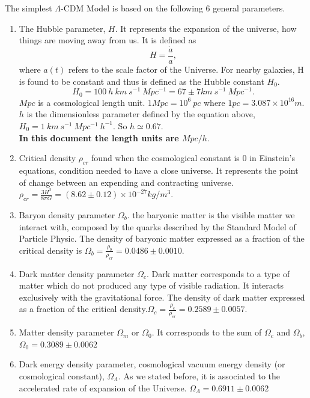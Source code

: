 \documentclass[12pt]{article}
\begin{document}
\begin{par}
The simplest $\Lambda$-CDM Model is based on the following 6 general parameters.\\
\begin{enumerate}
\item The Hubble parameter, $H$. It represents the expansion of the universe, how things are moving away from us. It is defined as
\[
H = \frac{\dot{a}}{a},
\]
where $a(t)$ refers to the scale factor of the Universe. For
 nearby galaxies, H is found to be constant and thus is
  defined as the Hubble constant $H_0$. 
\[
H_0 = 100 \ h \ km \ s^{-1} \ Mpc^{-1} = 67 \pm 7 km \  s^{-1} \ Mpc^{-1} .
\]
$Mpc$ is a cosmological length unit. $1 Mpc = 10^6 \ pc$ where $1 pc = 3.087 \times
  10^{16} m$. \\
  $h$ is the dimensionless parameter defined
   by the equation above, $H_0 = 1 \ km \ s^{-1} \ Mpc^{-1} \ h^{-1}$. So $h \simeq 0.67$.\\
   \textbf{In this document the length units are $Mpc/h$}.

\item Critical density $\rho_{cr}$ found when the cosmological constant is 0 in Einstein's equations, condition needed to have a close universe. It represents the point of change between an expending and contracting universe. $\rho_{cr} = \frac{3H^2}{8 \pi G} = (8.62 \pm 0.12) \times 10^{−27} kg/m^3$. 

\item Baryon density parameter $\Omega_b$. the baryonic matter is the visible matter we interact with, composed by the quarks described by the Standard Model of Particle Physic. The density of baryonic matter expressed as a fraction of the critical density is $\Omega_b = \frac{\rho_b}{\rho_{cr}} = 0.0486 \pm 0.0010$.

\item Dark matter density parameter $\Omega_c$. Dark matter corresponds to a type of matter which do not produced any type of visible radiation. It interacts exclusively with the gravitational force. The density of dark matter expressed as a fraction of the critical density.$\Omega_c = \frac{\rho_c}{\rho_{cr}} = 0.2589 \pm 0.0057$.

\item Matter density parameter $\Omega_m$ or $\Omega_0$.
 It corresponds to the sum of $\Omega_c$ and
  $\Omega_b$, $\Omega_0 = 0.3089 \pm 0.0062$

\item Dark energy density parameter, cosmological vacuum energy density (or cosmological constant), $\Omega_{\Lambda}$. As we stated before, it is associated to the accelerated rate of expansion of the Universe. $\Omega_{\Lambda} = 0.6911 \pm 0.0062$




\end{enumerate}
\end{par}
\end{document}
